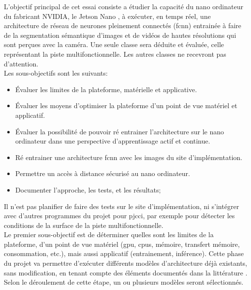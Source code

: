 ﻿\noindent L'objectif principal de cet essai consiste a étudier la capacité du nano ordinateur du fabricant NVIDIA, le Jetson Nano \parencite{nvidia_jetson_2019}, à exécuter, en temps réel, une architecture de réseau de neurones pleinement connectés (\acrshort{fcnn}) entrainée à faire de la segmentation sémantique d'images et de vidéos de hautes résolutions qui sont perçues avec la caméra. Une seule classe sera déduite et évaluée, celle représentant la piste multifonctionnelle. Les autres classes ne recevront pas d'attention.
\vspace{\baselineskip}
\\
\noindent Les sous-objectifs sont les suivants: 
\begin{itemize}
   \item Évaluer les limites de la plateforme, matérielle et applicative.
   \item Évaluer les moyens d'optimiser la plateforme d'un point de vue matériel et applicatif. 
   \item Évaluer la possibilité de pouvoir ré entrainer l'architecture sur le nano ordinateur dans une perspective d'apprentissage actif et continue.
   \item Ré entrainer une architecture \acrshort{fcnn} avec les images du site d'implémentation.
   \item Permettre un accès à distance sécurisé au nano ordinateur.
   \item Documenter l'approche, les tests, et les résultats;
\end{itemize}
\vspace{\baselineskip}
\noindent Il n'est pas planifier de faire des tests sur le site d'implémentation, ni s'intégrer avec d'autres programmes du projet pour \acrshort{pjcci}, par exemple pour détecter les conditions de la surface de la piste multifonctionnelle. 
\vspace{\baselineskip}
\\
\noindent Le premier sous-objectif est de déterminer quelles sont les limites de la plateforme, d'un point de vue matériel (\acrshort{gpu}, \acrshort{cpu}s, mémoire, transfert mémoire, consommation, etc.), mais aussi applicatif (entrainement, inférence). Cette phase du projet va permettre d'exécuter différents modèles d'architecture déjà existants, sans modification, en tenant compte des éléments documentés dans la littérature \parencite{nguyen_mavnet_2019, zheng_real-time_2020, nvidia_jetson_2019-1}. Selon le déroulement de cette étape, un ou plusieurs modèles seront sélectionnés. 
\vspace{\baselineskip}
